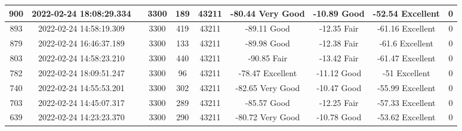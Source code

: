 \begin{longtable*}{|c|c|c|c|c|c|c|c|c|c|}
900&2022-02-24 18:08:29.334&&3300&189&43211& -80.44    Very Good   & -10.89    Good        & -52.54    Excellent   & 0\\\hline
{}893&2022-02-24 14:58:19.309&&3300&419&43211& -89.11    Good        & -12.35    Fair        & -61.16    Excellent   & 0\\\hline
{}879&2022-02-24 16:46:37.189&&3300&133&43211& -89.98    Good        & -12.38    Fair        & -61.6     Excellent   & 0\\\hline
{}803&2022-02-24 14:58:23.210&&3300&440&43211& -90.85    Fair        & -13.42    Fair        & -61.47    Excellent   & 0\\\hline
{}782&2022-02-24 18:09:51.247&&3300&96&43211& -78.47    Excellent   & -11.12    Good        & -51       Excellent   & 0\\\hline
{}740&2022-02-24 14:55:53.201&&3300&302&43211& -82.65    Very Good   & -10.47    Good        & -55.99    Excellent   & 0\\\hline
{}703&2022-02-24 14:45:07.317&&3300&289&43211& -85.57    Good        & -12.25    Fair        & -57.33    Excellent   & 0\\\hline
{}639&2022-02-24 14:23:23.370&&3300&290&43211& -80.72    Very Good   & -10.78    Good        & -53.62    Excellent   & 0\\\hline

\end{longtable*}
